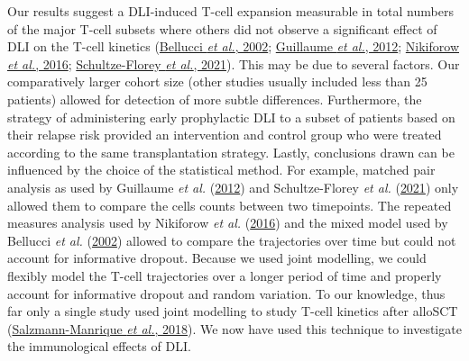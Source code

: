 \documentclass[
  letterpaper,
  DIV=11,
  numbers=noendperiod]{scrreprt}
\begin{document}
Our results suggest a DLI-induced T-cell expansion measurable in total
numbers of the major T-cell subsets where others did not observe a
significant effect of DLI on the T-cell kinetics
(\protect\hyperlink{ref-bellucciImmunologicEffectsProphylactic2002}{Bellucci
\emph{et al.}, 2002};
\protect\hyperlink{ref-guillaumeEscalatedLymphodepletionFollowed2012}{Guillaume
\emph{et al.}, 2012};
\protect\hyperlink{ref-nikiforowPhaseStudyCD252016}{Nikiforow \emph{et
al.}, 2016};
\protect\hyperlink{ref-schultze-floreyClonalExpansionCD82021}{Schultze-Florey
\emph{et al.}, 2021}). This may be due to several factors. Our
comparatively larger cohort size (other studies usually included less
than 25 patients) allowed for detection of more subtle differences.
Furthermore, the strategy of administering early prophylactic DLI to a
subset of patients based on their relapse risk provided an intervention
and control group who were treated according to the same transplantation
strategy. Lastly, conclusions drawn can be influenced by the choice of
the statistical method. For example, matched pair analysis as used by
Guillaume \emph{et al.}
(\protect\hyperlink{ref-guillaumeEscalatedLymphodepletionFollowed2012}{2012})
and Schultze-Florey \emph{et al.}
(\protect\hyperlink{ref-schultze-floreyClonalExpansionCD82021}{2021})
only allowed them to compare the cells counts between two timepoints.
The repeated measures analysis used by Nikiforow \emph{et al.}
(\protect\hyperlink{ref-nikiforowPhaseStudyCD252016}{2016}) and the
mixed model used by Bellucci \emph{et al.}
(\protect\hyperlink{ref-bellucciImmunologicEffectsProphylactic2002}{2002})
allowed to compare the trajectories over time but could not account for
informative dropout. Because we used joint modelling, we could flexibly
model the T-cell trajectories over a longer period of time and properly
account for informative dropout and random variation. To our knowledge,
thus far only a single study used joint modelling to study T-cell
kinetics after alloSCT
(\protect\hyperlink{ref-salzmann-manriqueJointModelingImmune2018a}{Salzmann-Manrique
\emph{et al.}, 2018}). We now have used this technique to investigate
the immunological effects of DLI.
\end{document}
